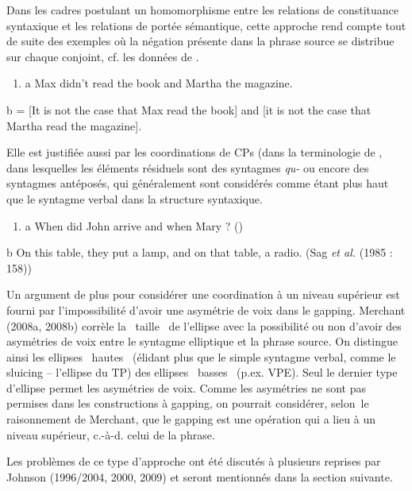 Dans les cadres postulant un homomorphisme entre les relations de constituance syntaxique et les relations de portée sémantique, cette approche rend compte tout de suite des exemples où la négation présente dans la phrase source se distribue sur chaque conjoint, cf. les données de \citet{Repp2009}.


\begin{enumerate}
\item a   Max didn't read the book and Martha the magazine.  


\end{enumerate}
  b  = [It is not the case that Max read the book] and [it is not the case that Martha read the magazine]. 

Elle est justifiée aussi par les coordinations de CPs (dans la terminologie de \citet{Repp2009}, dans lesquelles les éléments résiduels sont des syntagmes \textit{qu-} ou encore des syntagmes antéposés, qui généralement sont considérés comme étant plus haut que le syntagme verbal dans la structure syntaxique. 


\begin{enumerate}
\item a   When did John arrive and when Mary ?          (\citet[34]{Repp2009})


\end{enumerate}
  b  On this table, they put a lamp, and on that table, a radio.     (Sag \textit{et al.} (1985 : 158))

Un argument de plus pour considérer une coordination à un niveau supérieur est fourni par l'impossibilité d'avoir une asymétrie de voix dans le gapping. Merchant (2008a, 2008b) corrèle la {\guillemotleft}~taille~{\guillemotright} de l'ellipse avec la possibilité ou non d'avoir des asymétries de voix entre le syntagme elliptique et la phrase source. On distingue ainsi les ellipses {\guillemotleft}~hautes~{\guillemotright} (élidant plus que le simple syntagme verbal, comme le sluicing -- l'ellipse du TP) des ellipses {\guillemotleft}~basses~{\guillemotright} (p.ex. VPE). Seul le dernier type d'ellipse permet les asymétries de voix. Comme les asymétries ne sont pas permises dans les constructions à gapping, on pourrait considérer, selon~le raisonnement de Merchant, que le gapping est une opération qui a lieu à un niveau supérieur, c.-à-d. celui de la phrase.

Les problèmes de ce type d'approche ont été discutés à plusieurs reprises par Johnson (1996/2004, 2000, 2009) et seront mentionnés dans la section suivante. 

